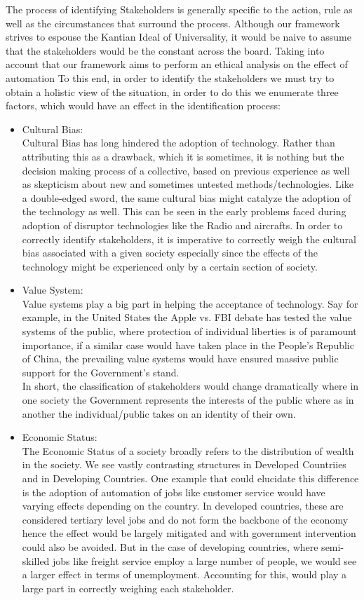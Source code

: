     The process of identifying Stakeholders is generally specific to the action, rule as well as the circumstances that surround the process. Although our framework strives to espouse the Kantian Ideal of Universality, it would be naive to assume that the stakeholders would be the constant across the board. Taking into account that our framework aims to perform an ethical analysis on the effect of automation
    To this end, in order to identify the stakeholders we must try to obtain a holistic view of the situation, in order to do this we enumerate three factors, which would have an effect in the identification process:\\
    \begin{itemize}
      \item Cultural Bias:\\
        Cultural Bias has long hindered the adoption of technology. Rather than attributing this as a drawback, which it is sometimes, it is nothing but the decision making process of a collective, based on previous experience as well as skepticism about new and sometimes untested methods/technologies. Like a double-edged sword, the same cultural bias might catalyze the adoption of the technology as well. This can be seen in the early problems faced during adoption of disruptor technologies like the Radio and aircrafts. In order to correctly identify stakeholders, it is imperative to correctly weigh the cultural bias associated with a given society especially since the effects of the technology might be experienced only by a certain section of society.
      \item  Value System:\\
        Value systems play a big part in helping the acceptance of technology. Say for example, in the United States the Apple vs. FBI debate has tested the value systems of the public, where protection of individual liberties is of paramount importance, if a similar case would have taken place in the People's Republic of China, the prevailing value systems would have ensured massive public support for the Government's stand.\\
        In short, the classification of stakeholders would change dramatically where in one society the Government represents the interests of the public where as in another the individual/public takes on an identity of their own.
      \item Economic Status:\\
        The Economic Status of a society broadly refers to the distribution of wealth in the society. We see vastly contrasting structures in Developed Countriies and in Developing Countries. One example that could elucidate this difference is the adoption of automation of jobs like customer service would have varying effects depending on the country. In developed countries, these are considered tertiary level jobs and do not form the backbone of the economy hence the effect would be largely mitigated and with government intervention could also be avoided. But in the case of developing countries, where semi-skilled jobs like freight service employ a large number of people, we would see a larger effect in terms of unemployment. Accounting for this, would play a large part in correctly weighing each stakeholder.
    \end{itemize}


